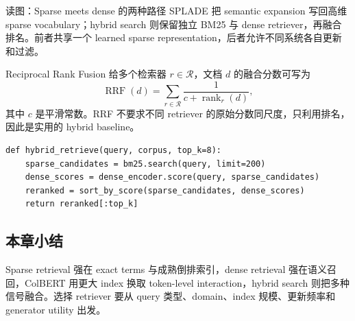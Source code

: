 
\begin{knowledgebox}{读图：Sparse meets dense 的两种路径}
SPLADE 把 semantic expansion 写回高维 sparse vocabulary；hybrid search 则保留独立 BM25 与 dense retriever，再融合排名。前者共享一个 learned sparse representation，后者允许不同系统各自更新和过滤。
\end{knowledgebox}

\begin{importantbox}{Reciprocal Rank Fusion}
给多个检索器 $r\in\mathcal{R}$，文档 $d$ 的融合分数可写为
\[
\operatorname{RRF}(d)=\sum_{r\in\mathcal{R}}\frac{1}{c+\operatorname{rank}_r(d)},
\]
其中 $c$ 是平滑常数。RRF 不要求不同 retriever 的原始分数同尺度，只利用排名，因此是实用的 hybrid baseline。
\end{importantbox}

\begin{lstlisting}[caption={Sparse recall + dense rerank 的两阶段检索}]
def hybrid_retrieve(query, corpus, top_k=8):
    sparse_candidates = bm25.search(query, limit=200)
    dense_scores = dense_encoder.score(query, sparse_candidates)
    reranked = sort_by_score(sparse_candidates, dense_scores)
    return reranked[:top_k]
\end{lstlisting}


\subsection{本章小结}

Sparse retrieval 强在 exact terms 与成熟倒排索引，dense retrieval 强在语义召回，ColBERT 用更大 index 换取 token-level interaction，hybrid search 则把多种信号融合。选择 retriever 要从 query 类型、domain、index 规模、更新频率和 generator utility 出发。

